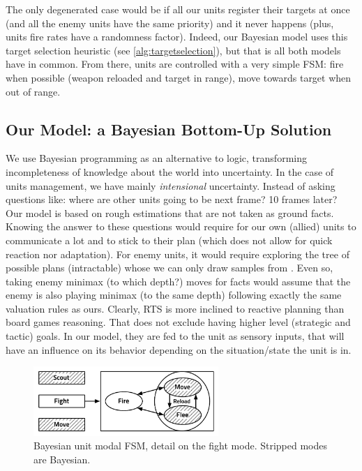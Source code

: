 The only degenerated case would be if all our units register their targets at once (and all the enemy units have the same priority) and it never happens (plus, units fire rates have a randomness factor). 
Indeed, our Bayesian model uses this target selection heuristic (see \ref{alg:targetselection}), but that is all both models have in common. From there, units are controlled with a very simple FSM: fire when possible (weapon reloaded and target in range), move towards target when out of range.

\subsection{Our Model: a Bayesian Bottom-Up Solution}

We use Bayesian programming as an alternative to logic, transforming incompleteness of knowledge about the world into uncertainty. In the case of units management, we have mainly \textit{intensional} uncertainty. Instead of asking questions like: where are other units going to be next frame? 10 frames later? Our model is based on rough estimations that are not taken as ground facts. Knowing the answer to these questions would require for our own (allied) units to communicate a lot and to stick to their plan (which does not allow for quick reaction nor adaptation). For enemy units, it would require exploring the tree of possible plans (intractable) whose we can only draw samples from \citep{UCT}. Even so, taking enemy minimax (to which depth?) moves for facts would assume that the enemy is also playing minimax (to the same depth) following exactly the same valuation rules as ours. Clearly, RTS  is more inclined to reactive planning than board games reasoning. That does not exclude having higher level (strategic and tactic) goals. In our model, they are fed to the unit as sensory inputs, that will have an influence on its behavior depending on the situation/state the unit is in.

\begin{figure}[!ht]
\begin{center}
\includegraphics[width=7cm]{images/unit_HFSM.pdf}
\end{center}
\label{fig:unit_HFSM}
\caption{Bayesian unit modal FSM, detail on the fight mode. Stripped modes are Bayesian.}
\end{figure}


